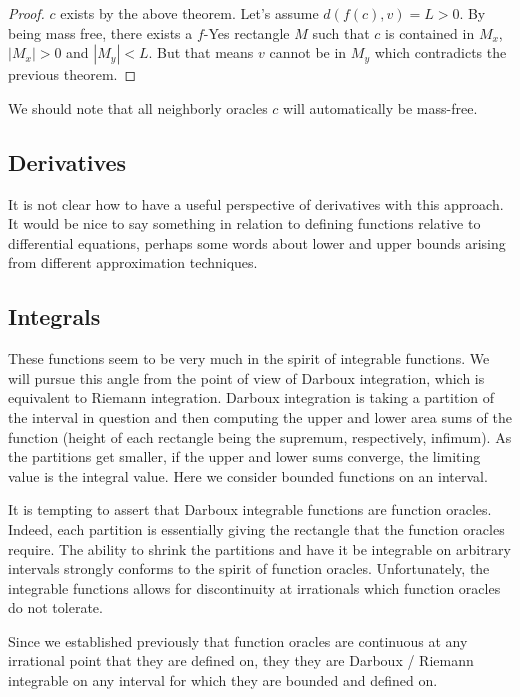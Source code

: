 \documentclass[12pt]{article}
\theoremstyle{remark}
\begin{document}
\begin{proof}
$c$ exists by the above theorem. Let's assume $d(f(c), v) = L > 0$. By being mass free, there exists a $f$-Yes rectangle $M$ such that $c$ is contained in $M_x$, $|M_x| > 0$ and $|M_y| < L$. But that means $v$ cannot be in $M_y$ which contradicts the previous theorem. 
\end{proof}
    
We should note that all neighborly oracles $c$ will automatically be mass-free. 


\subsection{Derivatives}

It is not clear how to have a useful perspective of derivatives with this approach. It would be nice to say something in relation to defining functions relative to differential equations, perhaps some words about lower and upper bounds arising from different approximation techniques. 

\subsection{Integrals}

These functions seem to be very much in the spirit of integrable functions. We will pursue this angle from the point of view of Darboux integration, which is equivalent to Riemann integration. Darboux integration is taking a partition of the interval in question and then computing the upper and lower area sums of the function (height of each rectangle being the supremum, respectively, infimum). As the partitions get smaller, if the upper and lower sums converge, the limiting value is the integral value. Here we consider bounded functions on an interval. 

It is tempting to assert that Darboux integrable functions are function oracles. Indeed, each partition is essentially giving the rectangle that the function oracles require. The ability to shrink the partitions and have it be integrable on arbitrary intervals strongly conforms to the spirit of function oracles. Unfortunately, the integrable functions allows for discontinuity at irrationals which function oracles do not tolerate. 

Since we established previously that function oracles are continuous at any irrational point that they are defined on, they they are Darboux / Riemann integrable on any interval for which they are bounded and defined on. 
\end{document}
